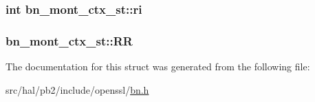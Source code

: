 \subsubsection[{\texorpdfstring{ri}{ri}}]{\setlength{\rightskip}{0pt plus 5cm}int bn\+\_\+mont\+\_\+ctx\+\_\+st\+::ri}\hypertarget{structbn__mont__ctx__st_a62ed733165c48fa02734f7374b81dbe3}{}\label{structbn__mont__ctx__st_a62ed733165c48fa02734f7374b81dbe3}
\subsubsection[{\texorpdfstring{RR}{RR}}]{ bn\+\_\+mont\+\_\+ctx\+\_\+st\+::\+RR}\hypertarget{structbn__mont__ctx__st_a80618d14450f431dfbd94cf22f603dda}{}\label{structbn__mont__ctx__st_a80618d14450f431dfbd94cf22f603dda}


The documentation for this struct was generated from the following file\+:\begin{DoxyCompactItemize}
\item 
src/hal/pb2/include/openssl/\hyperlink{bn_8h}{bn.\+h}\end{DoxyCompactItemize}
